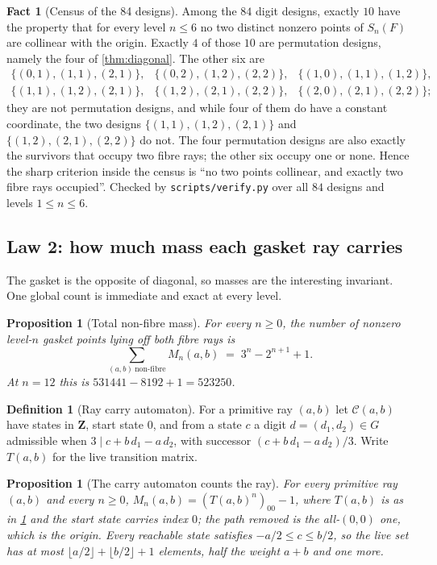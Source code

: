 \documentclass[11pt]{amsart}
\newtheorem{proposition}[theorem]{Proposition}
\theoremstyle{definition}
\newtheorem{definition}[theorem]{Definition}
\newtheorem{fact}[theorem]{Fact}
\theoremstyle{remark}
\begin{document}
\begin{fact}[Census of the 84 designs]
\label{fact:census84}
Among the $84$ digit designs, exactly $10$ have the property that for every level $n\le 6$ no two distinct nonzero points of $S_n(F)$ are collinear with the origin. Exactly $4$ of those $10$ are permutation designs, namely the four of \cref{thm:diagonal}. The other six are
\[
\begin{array}{lll}
\{(0,1),(1,1),(2,1)\}, & \{(0,2),(1,2),(2,2)\}, & \{(1,0),(1,1),(1,2)\},\\
\{(1,1),(1,2),(2,1)\}, & \{(1,2),(2,1),(2,2)\}, & \{(2,0),(2,1),(2,2)\};
\end{array}
\]
they are not permutation designs, and while four of them do have a constant coordinate, the two designs $\{(1,1),(1,2),(2,1)\}$ and $\{(1,2),(2,1),(2,2)\}$ do not. The four permutation designs are also exactly the survivors that occupy two fibre rays; the other six occupy one or none. Hence the sharp criterion inside the census is ``no two points collinear, and exactly two fibre rays occupied''. Checked by \texttt{scripts/verify.py} over all $84$ designs and levels $1\le n\le 6$.
\end{fact}

\subsection{Law 2: how much mass each gasket ray carries}

The gasket is the opposite of diagonal, so masses are the interesting invariant. One global count is immediate and exact at every level.

\begin{proposition}[Total non-fibre mass]
\label{prop:total}
For every $n\ge 0$, the number of nonzero level-$n$ gasket points lying off both fibre rays is
\[
\sum_{(a,b)\ \mathrm{non\text{-}fibre}} M_n(a,b) \;=\; 3^n-2^{n+1}+1 .
\]
At $n=12$ this is $531441-8192+1=523250$.
\end{proposition}

\begin{definition}[Ray carry automaton]
\label{def:raycarry}
For a primitive ray $(a,b)$ let $\mathcal{C}(a,b)$ have states in $\mathbf{Z}$, start state $0$, and from a state $c$ a digit $d=(d_1,d_2)\in G$ admissible when $3\mid c+b\,d_1-a\,d_2$, with successor $(c+b\,d_1-a\,d_2)/3$. Write $T(a,b)$ for the live transition matrix.
\end{definition}

\begin{proposition}[The carry automaton counts the ray]
\label{prop:raycarry}
For every primitive ray $(a,b)$ and every $n\ge 0$, $M_n(a,b)=(T(a,b)^n)_{00}-1$, where $T(a,b)$ is as in \cref{def:raycarry} and the start state carries index $0$; the path removed is the all-$(0,0)$ one, which is the origin. Every reachable state satisfies $-a/2\le c\le b/2$, so the live set has at most $\lfloor a/2\rfloor+\lfloor b/2\rfloor+1$ elements, half the weight $a+b$ and one more.
\end{proposition}
\end{document}
